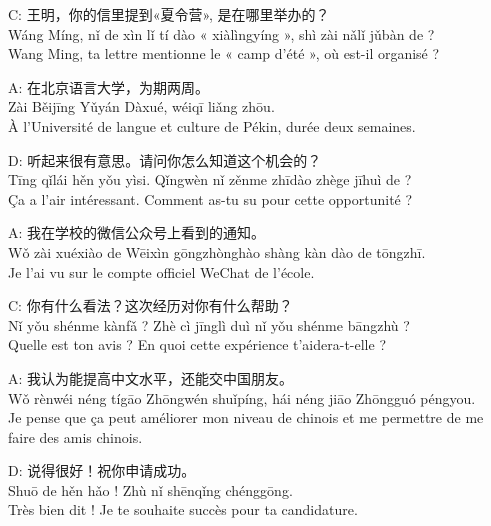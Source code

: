 \documentclass[11pt]{article}
\begin{document}
\begin{textebox}
C: 王明，你的信里提到«夏令营», 是在哪里举办的？\\
Wáng Míng, nǐ de xìn lǐ tí dào « xiàlìngyíng », shì zài nǎlǐ jǔbàn de ?\\
Wang Ming, ta lettre mentionne le « camp d'été », où est-il organisé ?

A: 在北京语言大学，为期两周。\\
Zài Běijīng Yǔyán Dàxué, wéiqī liǎng zhōu.\\
À l'Université de langue et culture de Pékin, durée deux semaines.

D: 听起来很有意思。请问你怎么知道这个机会的？\\
Tīng qǐlái hěn yǒu yìsi. Qǐngwèn nǐ zěnme zhīdào zhège jīhuì de ?\\
Ça a l'air intéressant. Comment as-tu su pour cette opportunité ?

A: 我在学校的微信公众号上看到的通知。\\
Wǒ zài xuéxiào de Wēixìn gōngzhònghào shàng kàn dào de tōngzhī.\\
Je l'ai vu sur le compte officiel WeChat de l'école.

C: 你有什么看法？这次经历对你有什么帮助？\\
Nǐ yǒu shénme kànfǎ ? Zhè cì jīnglì duì nǐ yǒu shénme bāngzhù ?\\
Quelle est ton avis ? En quoi cette expérience t'aidera-t-elle ?

A: 我认为能提高中文水平，还能交中国朋友。\\
Wǒ rènwéi néng tígāo Zhōngwén shuǐpíng, hái néng jiāo Zhōngguó péngyou.\\
Je pense que ça peut améliorer mon niveau de chinois et me permettre de me faire des amis chinois.

D: 说得很好！祝你申请成功。\\
Shuō de hěn hǎo ! Zhù nǐ shēnqǐng chénggōng.\\
Très bien dit ! Je te souhaite succès pour ta candidature.
\end{textebox}
\end{document}
